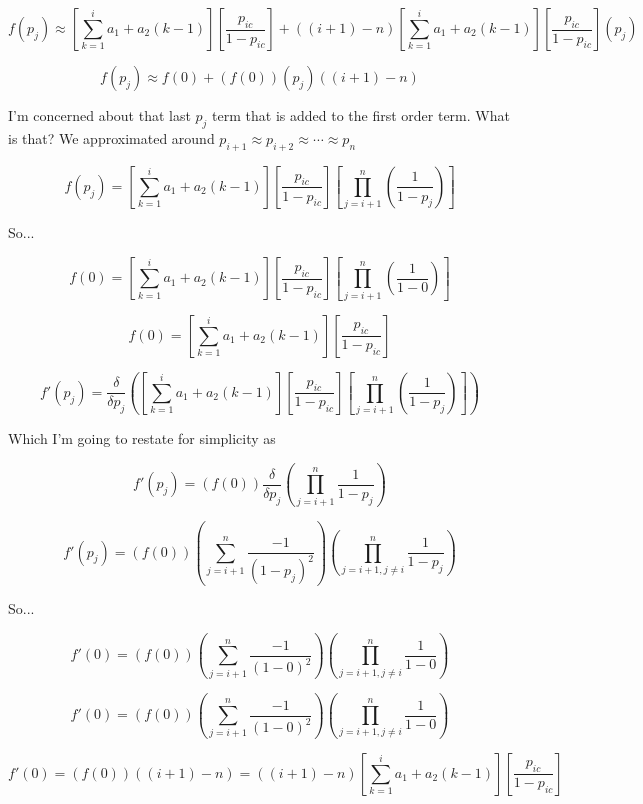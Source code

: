 \documentclass[11pt]{article} %
\begin{document}
$$
f(p_j) \approx
\left[\sum_{k=1}^{i} a_1 + a_2(k-1)\right]
\left[\frac{p_{ic}}{1-p_{ic}}\right]
+
\left( (i+1) - n \right)
\left[\sum_{k=1}^{i} a_1 + a_2(k-1)\right]
\left[\frac{p_{ic}}{1-p_{ic}}\right]
\left( p_{j} \right)
$$


$$
f(p_j) \approx
f(0) + (f(0))(p_j)((i+1)-n)
$$

I'm concerned about that last $p_j$ term that is added to the first order term. What is that? We approximated around $p_{i+1} \approx p_{i+2} \approx \cdots \approx p_n$

\noindent\makebox[\linewidth]{\rule{\textwidth}{1pt}} 


$$
f(p_{j})=
\left[\sum_{k=1}^{i} a_1 + a_2(k-1)\right]
\left[\frac{p_{ic}}{1-p_{ic}}\right]
\left[\prod_{j=i+1}^{n}(\frac{1}{1-p_{j}})\right]
$$

So...

$$
f(0) = 
\left[\sum_{k=1}^{i} a_1 + a_2(k-1)\right]
\left[\frac{p_{ic}}{1-p_{ic}}\right]
\left[\prod_{j=i+1}^{n}(\frac{1}{1-0})\right]
$$

$$
f(0) = 
\left[\sum_{k=1}^{i} a_1 + a_2(k-1)\right]
\left[\frac{p_{ic}}{1-p_{ic}}\right]
$$


\noindent\makebox[\linewidth]{\rule{\textwidth}{1pt}} 


$$
f'(p_{j})=\frac{\delta}{\delta p_{j}}
\left(
\left[\sum_{k=1}^{i} a_1 + a_2(k-1)\right]
\left[\frac{p_{ic}}{1-p_{ic}}\right]
\left[\prod_{j=i+1}^{n}(\frac{1}{1-p_{j}})\right]
\right)
$$

Which I'm going to restate for simplicity as 

$$
f'(p_{j})=
\left( f(0) \right)
\frac{\delta}{\delta p_{j}}
\left(\prod_{j=i+1}^{n}\frac{1}{1-p_{j}}\right)
$$


$$
f'(p_{j})=
\left( f(0) \right)
\left( \sum_{j=i+1}^{n} \frac{-1}{(1-p_{j})^2} \right)
\left( \prod_{j=i+1, j \neq i}^{n} \frac{1}{1-p_{j}}\right)
$$

So...

$$
f'(0)=
\left( f(0) \right)
\left( \sum_{j=i+1}^{n} \frac{-1}{(1-0)^2} \right)
\left( \prod_{j=i+1, j \neq i}^{n} \frac{1}{1-0}\right)
$$


$$
f'(0)=
\left( f(0) \right)
\left( \sum_{j=i+1}^{n} \frac{-1}{(1-0)^2} \right)
\left( \prod_{j=i+1, j \neq i}^{n} \frac{1}{1-0}\right)
$$

$$
f'(0)=
\left( f(0) \right)
\left( (i+1) - n \right)
=\left( (i+1) - n \right)
\left[\sum_{k=1}^{i} a_1 + a_2(k-1)\right]
\left[\frac{p_{ic}}{1-p_{ic}}\right]
$$
\end{document}
